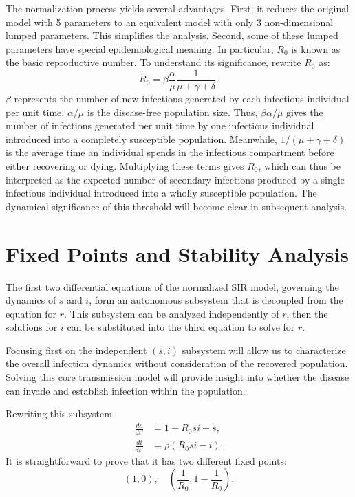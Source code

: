 The normalization process yields several advantages. First, it reduces the original model with 5 parameters to an equivalent model with only 3 non-dimensional lumped parameters. This simplifies the analysis. Second, some of these lumped parameters have special epidemiological meaning. In particular, $R_0$ is known as the basic reproductive number. To understand its significance, rewrite $R_0$ as:
\begin{equation*}
R_0 = \beta \frac{\alpha}{\mu} \frac{1}{\mu+\gamma+\delta}.
\end{equation*}
$\beta$ represents the number of new infections generated by each infectious individual per unit time. $\alpha/\mu$ is the disease-free population size. Thus, $\beta \alpha / \mu$ gives the number of infections generated per unit time by one infectious individual introduced into a completely susceptible population. Meanwhile, $1/(\mu+\gamma+\delta)$ is the average time an individual spends in the infectious compartment before either recovering or dying. Multiplying these terms gives $R_0$, which can thus be interpreted as the expected number of secondary infections produced by a single infectious individual introduced into a wholly susceptible population. The dynamical significance of this threshold will become clear in subsequent analysis.

\section{Fixed Points and Stability Analysis}

The first two differential equations of the normalized SIR model, governing the dynamics of $s$ and $i$, form an autonomous subsystem that is decoupled from the equation for $r$. This subsystem can be analyzed independently of $r$, then the solutions for $i$ can be substituted into the third equation to solve for $r$.

Focusing first on the independent $(s,i)$ subsystem will allow us to characterize the overall infection dynamics without consideration of the recovered population. Solving this core transmission model will provide insight into whether the disease can invade and establish infection within the population.

Rewriting this subsystem
\begin{align*}
    \frac{ds}{dt'} &= 1 - R_0 si - s,\\
    \frac{di}{dt'} &= \rho (R_0 si - i).
\end{align*}
It is straightforward to prove that it has two different fixed points:
\begin{equation*}
    (1,0), \quad  \left( \frac{1}{R_0}, 1 - \frac{1}{R_0} \right).
\end{equation*}

